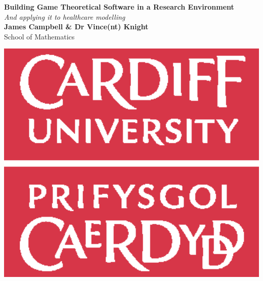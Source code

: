 \documentclass[a0,landscape]{a0poster}
\begin{document}
\begin{minipage}[b]{0.7\linewidth}
\veryHuge \color{NavyBlue} \textbf{Building Game Theoretical Software in a Research Environment} \color{Black}\\ %
\Huge\textit{And applying it to healthcare modelling}\\[1cm] %
\huge \textbf{James Campbell \& Dr Vince(nt) Knight}\\ %
\huge School of Mathematics\\ %
\end{minipage}
%
%
\begin{minipage}[b]{0.3\linewidth}
\centering
\includegraphics[width=15cm]{images/logo.eps}
\end{minipage}
\end{document}
